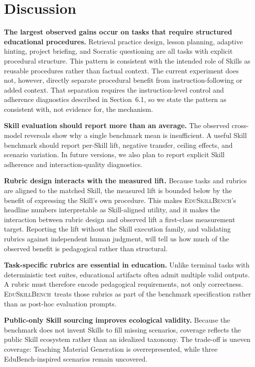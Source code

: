 \documentclass[10pt]{article}
\newcommand{\bench}{\textsc{EduSkillBench}\xspace}
\begin{document}
\section{Discussion}

\textbf{The largest observed gains occur on tasks that require structured educational procedures.}
Retrieval practice design, lesson planning, adaptive hinting, project briefing, and Socratic questioning are all tasks with explicit procedural structure. This pattern is consistent with the intended role of Skills as reusable procedures rather than factual context. The current experiment does not, however, directly separate procedural benefit from instruction-following or added context. That separation requires the instruction-level control and adherence diagnostics described in Section~6.1, so we state the pattern as consistent with, not evidence for, the mechanism.

\textbf{Skill evaluation should report more than an average.}
The observed cross-model reversals show why a single benchmark mean is insufficient. A useful Skill benchmark should report per-Skill lift, negative transfer, ceiling effects, and scenario variation. In future versions, we also plan to report explicit Skill adherence and interaction-quality diagnostics.

\textbf{Rubric design interacts with the measured lift.}
Because tasks and rubrics are aligned to the matched Skill, the measured lift is bounded below by the benefit of expressing the Skill's own procedure. This makes \bench's headline numbers interpretable as Skill-aligned utility, and it makes the interaction between rubric design and observed lift a first-class measurement target. Reporting the lift without the Skill execution family, and validating rubrics against independent human judgment, will tell us how much of the observed benefit is pedagogical rather than structural.

\textbf{Task-specific rubrics are essential in education.}
Unlike terminal tasks with deterministic test suites, educational artifacts often admit multiple valid outputs. A rubric must therefore encode pedagogical requirements, not only correctness. \bench~treats those rubrics as part of the benchmark specification rather than as post-hoc evaluation prompts.

\textbf{Public-only Skill sourcing improves ecological validity.}
Because the benchmark does not invent Skills to fill missing scenarios, coverage reflects the public Skill ecosystem rather than an idealized taxonomy. The trade-off is uneven coverage: Teaching Material Generation is overrepresented, while three EduBench-inspired scenarios remain uncovered.
\end{document}
